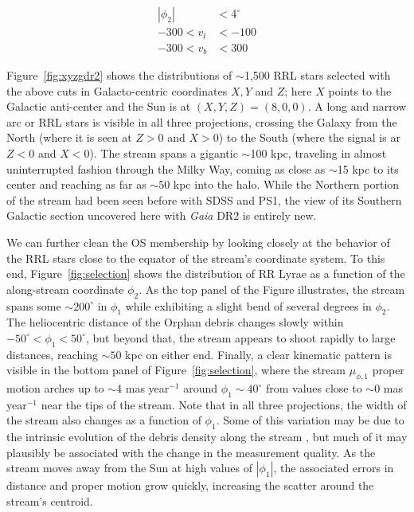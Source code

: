 \documentclass[a4paper,useAMS,usenatbib]{mnras}
\newcommand{\gaia}{\textit{Gaia} }
\begin{document}
%
\begin{equation}
  \begin{aligned}
    |\phi_2| &< 4^{\circ}\\
    -300<v_l &<-100\\
    -300<v_b &<300
  \end{aligned}
\end{equation}
%

Figure~\ref{fig:xyzgdr2} shows the distributions of $\sim$1,500 RRL
stars selected with the above cuts in Galacto-centric coordinates
$X,Y$ and $Z$; here $X$ points to the Galactic anti-center and the Sun
is at $(X,Y,Z)=(8,0,0)$. A long and narrow arc or RRL stars is visible
in all three projections, crossing the Galaxy from the North (where it
is seen at $Z>0$ and $X>0$) to the South (where the signal is ar $Z<0$
and $X<0$). The stream spans a gigantic $\sim$100 kpc, traveling in
almost uninterrupted fashion through the Milky Way, coming as close as
$\sim$15 kpc to its center and reaching as far as $\sim$50 kpc into
the halo. While the Northern portion of the stream had been seen
before with SDSS and PS1, the view of its Southern Galactic section
uncovered here with \gaia DR2 is entirely new.

We can further clean the OS membership by looking closely at the
behavior of the RRL stars close to the equator of the stream's
coordinate system. To this end, Figure~\ref{fig:selection} shows the
distribution of RR Lyrae as a function of the along-stream coordinate
$\phi_2$. As the top panel of the Figure illustrates, the stream spans
some $\sim200^{\circ}$ in $\phi_1$ while exhibiting a slight bend of
several degrees in $\phi_2$. The heliocentric distance of the Orphan
debris changes slowly within $-50^{\circ}<\phi_1<50^{\circ}$, but
beyond that, the stream appears to shoot rapidly to large distances,
reaching $\sim50$ kpc on either end. Finally, a clear kinematic
pattern is visible in the bottom panel of Figure~\ref{fig:selection},
where the stream $\mu_{\phi,1}$ proper motion arches up to $\sim$4 mas
year$^{-1}$ around $\phi_1\sim40^{\circ}$ from values close to $\sim0$
mas year$^{-1}$ near the tips of the stream. Note that in all three
projections, the width of the stream also changes as a function of
$\phi_1$. Some of this variation may be due to the intrinsic evolution
of the debris density along the stream \citep[see e.g.][]{stray}, but
much of it may plausibly be associated with the change in the
measurement quality. As the stream moves away from the Sun at high
values of $|\phi_1|$, the associated errors in distance and proper
motion grow quickly, increasing the scatter around the stream's
centroid. 
\end{document}
